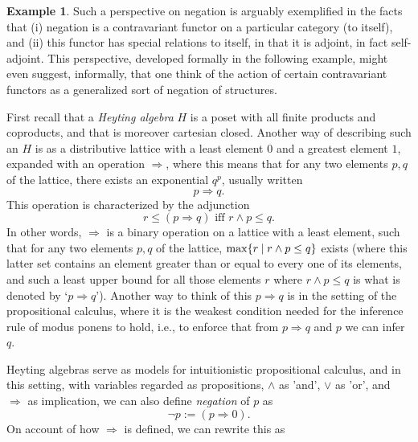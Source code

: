 \documentclass[a4paper]{book}
\theoremstyle{definition}
\newtheorem{example}{Example}[section]
\theoremstyle{definition}
\theoremstyle{definition}
\theoremstyle{theorem}
\theoremstyle{definition}
\begin{document}
\begin{example}
	Such a perspective on negation is arguably exemplified in the facts that (i) negation is a contravariant functor on a particular category (to itself), and (ii) this functor has special relations to itself, in that it is adjoint, in fact self-adjoint. This perspective, developed formally in the following example, might even suggest, informally, that one think of the action of certain contravariant functors as a generalized sort of negation of structures. \par 
	First recall that a \textit{Heyting algebra} $H$ is a poset with all finite products and coproducts, and that is moreover cartesian closed. Another way of describing such an $H$ is as a distributive lattice with a least element $0$ and a greatest element $1$, expanded with an operation $\Rightarrow$, where this means that for any two elements $p, q$ of the lattice, there exists an exponential $q^p$, usually written 
	\begin{equation*}
	p \Rightarrow q.
	\end{equation*}
	This operation is characterized by the adjunction  
	\begin{equation*}
	r \leq (p \Rightarrow q) \text{ iff } r \wedge p \leq q. 
	\end{equation*}	  
	In other words, $\Rightarrow$ is a binary operation on a lattice with a least element, such that for any two elements $p, q$ of the lattice, $\max \{r \hspace*{0.25em}| \hspace*{0.25em} r \wedge p \leq q \}$ exists (where this latter set contains an element greater than or equal to every one of its elements, and such a least upper bound for all those elements $r$ where $r \wedge p \leq q$ is what is denoted by `$p \Rightarrow q$'). Another way to think of this $p \Rightarrow q$ is in the setting of the propositional calculus, where it is the weakest condition needed for the inference rule of modus ponens to hold, i.e., to enforce that from $p \Rightarrow q$ and $p$ we can infer $q$.\par 
	Heyting algebras serve as models for intuitionistic propositional calculus, and in this setting, with variables regarded as propositions, $\wedge$ as 'and', $\vee$ as 'or', and $\Rightarrow$ as implication, we can also define \textit{negation} of $p$ as 
	\begin{equation*}
	\neg p := (p \Rightarrow 0). 
	\end{equation*}  
	On account of how $\Rightarrow$ is defined, we can rewrite this as 

\end{example}
\end{document}
